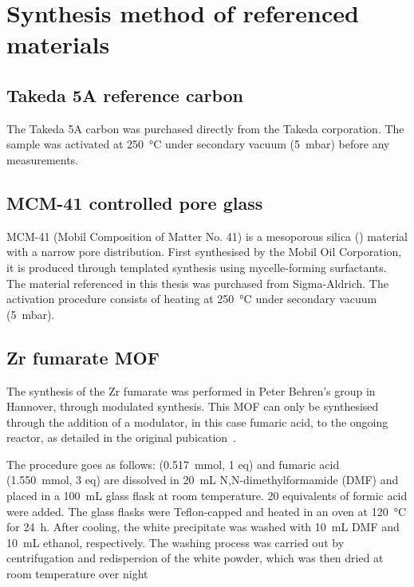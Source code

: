 
\graphicspath{ {\thisappx/figures/} }

\chapter{Synthesis method of referenced materials}%
\label{appx:synthesis}

\section{Takeda 5A reference carbon}%
\label{appx:synthesis:takeda}

The Takeda 5A carbon was purchased directly from the Takeda corporation.
The sample was activated at \SI{250}{\celsius} under 
secondary vacuum (\SI{5}{\milli\bar}) before any measurements.

\section{MCM-41 controlled pore glass}%
\label{appx:synthesis:mcm41}

MCM-41 (Mobil Composition of Matter No. 41) is a mesoporous silica 
() material with a narrow pore distribution. First synthesised 
by the Mobil Oil Corporation, it is produced through templated 
synthesis using mycelle-forming surfactants.
The material referenced in this thesis was purchased from Sigma-Aldrich.
The activation procedure consists of heating at \SI{250}{\celsius} under 
secondary vacuum (\SI{5}{\milli\bar}).

\section{Zr fumarate MOF}%
\label{appx:synthesis:zrformate}

The synthesis of the Zr fumarate was performed in Peter Behren's 
group in Hannover, through modulated synthesis. This MOF can only
be synthesised through the addition of a modulator, in this case
fumaric acid, to the ongoing reactor, as detailed in the 
original pubication~\cite{wissmannModulatedSynthesisZrfumarate2012}.

The procedure goes as follows: 
(\SI{0.517}{\milli\mol}, 1 eq) and fumaric acid 
(\SI{1.550}{\milli\mol}, 3 eq) are dissolved 
in \SI{20}{\milli\liter} N,N-dimethylformamide (DMF) 
and placed in a \SI{100}{\milli\liter} glass flask at room 
temperature. 20 equivalents of formic acid were added.
The glass flasks were Teflon-capped and heated in an oven at
\SI{120}{\degreeCelsius} for \SI{24}{\hour}. After cooling, 
the white precipitate was washed with \SI{10}{\milli\liter} 
DMF and \SI{10}{\milli\liter} ethanol, respectively. 
The washing process was carried out by centrifugation and 
redispersion of the white powder, which was then
dried at room temperature over night

